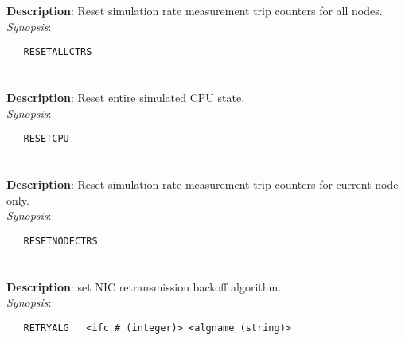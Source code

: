 \section{\quad{}}
\label{manpages:RESETALLCTRS}
\label{manpages:resetallctrs}
\vspace{-0.1in}
{\bf Description}: 	Reset simulation rate measurement trip counters for all nodes.\\[1.5ex]
{\em Synopsis}:
\vspace{-0.05in}
\scriptsize
\begin{lstlisting}
   RESETALLCTRS   																	
\end{lstlisting}
\normalsize
\vspace{-0.05in}


\section{\quad{}}
\label{manpages:RESETCPU}
\label{manpages:resetcpu}
\vspace{-0.1in}
{\bf Description}: 	Reset entire simulated CPU state.\\[1.5ex]
{\em Synopsis}:
\vspace{-0.05in}
\scriptsize
\begin{lstlisting}
   RESETCPU   										
\end{lstlisting}
\normalsize
\vspace{-0.05in}


\section{\quad{}}
\label{manpages:RESETNODECTRS}
\label{manpages:resetnodectrs}
\vspace{-0.1in}
{\bf Description}: 	Reset simulation rate measurement trip counters for current node only.\\[1.5ex]
{\em Synopsis}:
\vspace{-0.05in}
\scriptsize
\begin{lstlisting}
   RESETNODECTRS   																
\end{lstlisting}
\normalsize
\vspace{-0.05in}


\section{\quad{}}
\label{manpages:RETRYALG}
\label{manpages:retryalg}
\vspace{-0.1in}
{\bf Description}: 	set NIC retransmission backoff algorithm.\\[1.5ex]
{\em Synopsis}:
\vspace{-0.05in}
\scriptsize
\begin{lstlisting}
   RETRYALG   <ifc # (integer)> <algname (string)>																
\end{lstlisting}
\normalsize
\vspace{-0.05in}



